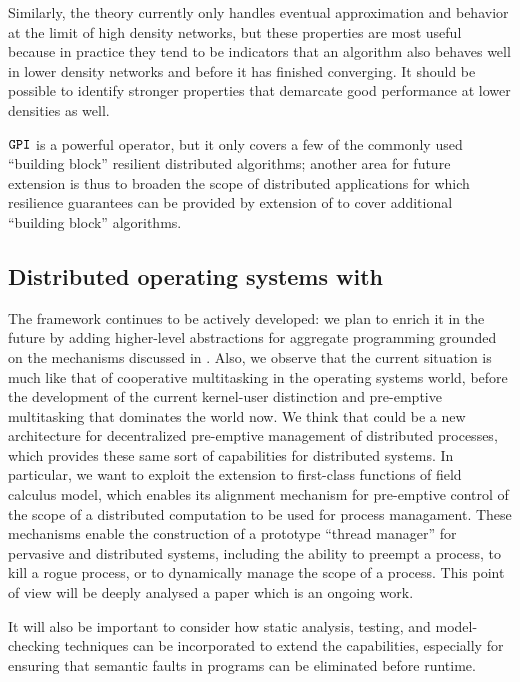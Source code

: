 \documentclass[12pt,a4paper,twoside,openright]{book}
\begin{document}
Similarly, the theory currently only handles eventual approximation and behavior at the limit of high density networks, but these properties are most useful because in practice they tend to be indicators that an algorithm also behaves well in lower density networks and before it has finished converging.  It should be possible to identify stronger properties that demarcate good performance at lower densities as well.

$\texttt{GPI}$ is a powerful operator, but it only covers a few of the commonly used ``building block'' resilient distributed algorithms; another area for future extension is thus to broaden the scope of distributed applications for which resilience guarantees can be provided by extension of \calculus{} to cover additional ``building block'' algorithms.

\subsection{Distributed operating systems with \protelis{}}

The \protelis{} framework continues to be actively developed: we plan to enrich it in the future by adding higher-level abstractions for aggregate programming grounded on the mechanisms discussed in .
%
Also, we observe that the current situation is much like that of cooperative multitasking in the operating systems world, before the development of the current kernel-user distinction and pre-emptive multitasking that dominates the world now.
%
We think that \protelis{} could be a new architecture for decentralized pre-emptive management of distributed processes, which provides these same sort of capabilities for distributed systems.
%
In particular, we want to exploit the extension to first-class functions of field calculus model, which enables its alignment mechanism for pre-emptive control of the scope of a distributed computation to be used for process managament.
%
These mechanisms enable the construction of a prototype ``thread manager'' for pervasive and distributed systems, including the ability to preempt a process, to kill a rogue process, or to dynamically manage the scope of a process.
%
This point of view will be deeply analysed a paper which is an ongoing work.

It will also be important to consider how static analysis, testing, and model-checking techniques can be incorporated to extend the capabilities, especially for ensuring that semantic faults in programs can be eliminated before runtime.
\end{document}
